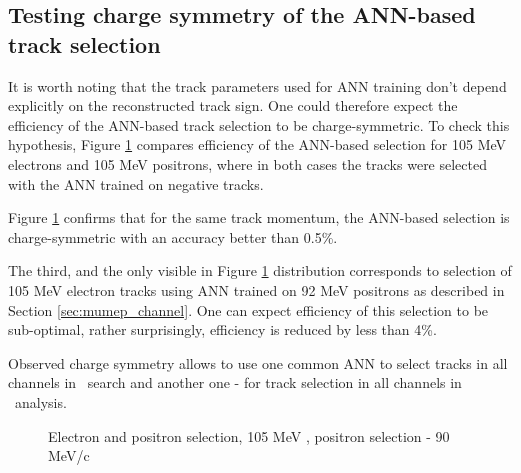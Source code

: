 \subsection{Testing charge symmetry of the ANN-based track selection}

It is worth noting that the track parameters used for ANN training don't depend explicitly
on the reconstructed track sign. One could therefore expect the efficiency of the ANN-based
track selection to be charge-symmetric. To check this hypothesis, Figure \ref{fig:su2020_mva_test_dar}
compares efficiency of the ANN-based selection for 105 MeV electrons and 105 MeV positrons, where
in both cases the tracks were selected with the ANN trained on negative tracks.

Figure \ref{fig:su2020_mva_test_dar} confirms that for the same track momentum, the ANN-based  selection
is charge-symmetric with an accuracy better than 0.5\%.

The third, and the only visible in Figure \ref{fig:su2020_mva_test_dar} distribution corresponds to
selection of 105 MeV electron tracks using ANN trained on  92 MeV positrons as described in
Section \ref{sec:mumep_channel}. One can expect efficiency of this selection to be sub-optimal,
rather surprisingly, efficiency is reduced by less than 4\%.

Observed charge symmetry allows to use one common ANN to select tracks in all channels in \MuToEm\ search 
and another one - for track selection in all channels in \MuToEp\ analysis.

\begin{figure}
  \caption{
    \label{fig:su2020_mva_test_dar} 
    Electron and positron selection, 105 MeV , positron selection - 90 MeV/c
  }
\end{figure}


